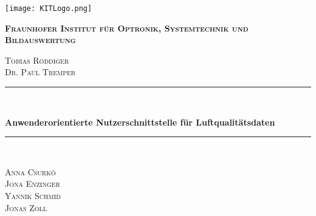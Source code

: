 \begin{titlepage}
  \centering
  \texttt{[image: KITLogo.png]}\par\vspace{1cm}
  	{\scshape \bfseries Fraunhofer Institut für Optronik, Systemtechnik und Bildauswertung\par}
	  \vspace{0.25cm}
  	{\scshape Tobias Röddiger\\Dr. Paul Tremper\par}
  	\vspace{1.5cm}

    \newcommand{\HRule}{\rule{\linewidth}{0.5mm}}
    {\color{mintgreen}\HRule} \\[0.4cm]
  	{\huge \bfseries \LARGE Anwenderorientierte Nutzerschnittstelle für Luftqualitätsdaten\par}
    {\color{mintgreen}\HRule} \\[1cm]
  	\vspace{2cm}
  	{\scshape \Large Anna Csurkó\\Jona Enzinger\\Yannik Schmid\\Jonas Zoll\par}
  	\vfill

\end{titlepage}

